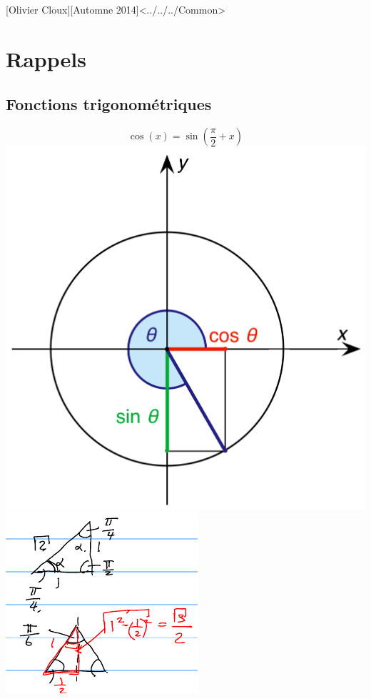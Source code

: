 \documentclass[12pt,a4paper]{article}
\begin{document}
[Olivier Cloux][Automne 2014]<../../../Common>
\tableofcontents

\section{Rappels}
\subsection{Fonctions trigonométriques}
\begin{center}
\[\cos(x) = \sin(\frac{\pi}{2} + x)\]
\includegraphics[scale=0.2]{illustrations_Analyse/sin_and_cos}
\includegraphics[scale=0.7]{illustrations_Analyse/trigo}\\
\end{center}
\end{document}
